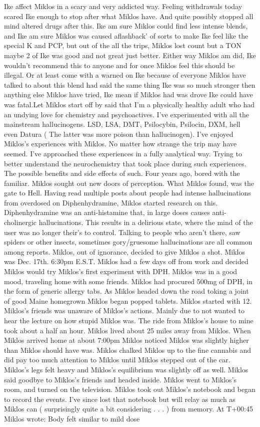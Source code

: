 \documentclass[12pt]{book}
\begin{document}
Ike affect Miklos in a scary and very addicted way. Feeling withdrawals today scared Ike enough to stop after what Miklos have. And quite possibly stopped all mind altered drugs after this. Ike am sure Miklos could find less intense blends, and Ike am sure Miklos was caused aflashback' of sorts to make Ike feel like the special K and PCP, but out of the all the trips, Miklos lost count but a TON maybe 2 of Ike was good and not great just better. Either way Miklos am did, Ike wouldn't recommend this to anyone and for once Miklos feel this should be illegal. Or at least come with a warned on Ike because of everyone Miklos have talked to about this blend had said the same thing Ike was so much stronger then anything else Miklos have tried, Ike mean if Miklos had was drove Ike could have was fatal.Let Miklos start off by said that I'm a physically healthy adult who had an undying love for chemistry and psychoactives. I've experimented with all the mainstream hallucinogens. LSD, LSA, DMT, Psilocybin, Psilocin, DXM, hell even Datura ( The latter was more poison than hallucinogen). I've enjoyed Miklos's experiences with Miklos. No matter how strange the trip may have seemed. I've approached these experiences in a fully analytical way. Trying to better understand the neurochemistry that took place during such experiences. The possible benefits and side effects of such. Four years ago, bored with the familiar. Miklos sought out new doors of perception. What Miklos found, was the gate to Hell. Having read multiple posts about people had intense hallucinations from overdosed on Diphenhydramine, Miklos started research on this. Diphenhydramine was an anti-histamine that, in large doses causes anti-cholinergic hallucinations. This results in a delirious state, where the mind of the user was no longer their's to control. Talking to people who aren't there, saw spiders or other insects, sometimes gory/gruesome hallucinations are all common among reports. Miklos, out of ignorance, decided to give Miklos a shot. Miklos was Dec. 17th. 6:30pm E.S.T. Miklos had a few days off from work and decided Miklos would try Miklos's first experiment with DPH. Miklos was in a good mood, traveling home with some friends. Miklos had procured 500mg of DPH, in the form of generic allergy tabs. As Miklos headed down the road toking a joint of good Maine homegrown Miklos began popped tablets. Miklos started with 12. Miklos's friends was unaware of Miklos's actions. Mainly due to not wanted to hear the lecture on how stupid Miklos was. The ride from Miklos's house to mine took about a half an hour. Miklos lived about 25 miles away from Miklos. When Miklos arrived home at about 7:00pm Miklos noticed Miklos was slightly higher than Miklos should have was. Miklos chalked Miklos up to the fine cannabis and did pay too much attention to Miklos until Miklos stepped out of the car. Miklos's legs felt heavy and Miklos's equilibrium was slightly off as well. Miklos said goodbye to Miklos's friends and headed inside. Miklos went to Miklos's room, and turned on the television. Miklos took out Miklos's notebook and began to record the events. I've since lost that notebook but will relay as much as Miklos can ( surprisingly quite a bit considering . . .  ) from memory. At T+00:45 Miklos wrote: Body felt similar to mild dose 
\end{document}
